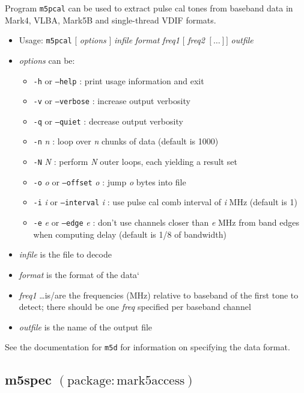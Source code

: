 Program {\tt m5pcal} can be used to extract pulse cal tones from baseband data in Mark4, VLBA, Mark5B and single-thread VDIF formats.

\begin{itemize}
\item[] Usage: {\tt m5pcal} $[$ {\em options} $]$ {\em infile} {\em format} {\em freq1} $[$ {\em freq2} $[ \ldots ] ]$ {\em outfile}
\item[] {\em options} can be:
\begin{itemize}
\item[] {\tt -h} or {\tt --help} : print usage information and exit
\item[] {\tt -v} or {\tt --verbose} : increase output verbosity
\item[] {\tt -q} or {\tt --quiet} : decrease output verbosity
\item[] {\tt -n} {\em n} : loop over {\em n} chunks of data (default is 1000)
\item[] {\tt -N} {\em N} : perform {\em N} outer loops, each yielding a result set
\item[] {\tt -o} {\em o} or {\tt --offset} {\em o} : jump {\em o} bytes into file
\item[] {\tt -i} {\em i} or {\tt --interval} {\em i} : use pulse cal comb interval of {\em i} MHz (default is 1)
\item[] {\tt -e} {\em e} or {\tt --edge} {\em e} : don't use channels closer than {\em e} MHz from band edges when computing delay (default is 1/8 of bandwidth)
\end{itemize}
\item[] {\em infile} is the file to decode
\item[] {\em format} is the format of the data`
\item[] {\em freq1} \ldots is/are the frequencies (MHz) relative to baseband of the first tone to detect; there should be one {\em freq} specified per baseband channel
\item[] {\em outfile} is the name of the output file
\end{itemize}

See the documentation for {\tt m5d} for information on specifying the data format.








\subsection{m5spec {\small $\mathrm{(package: mark5access)}$}} \label{sec:m5spec}

